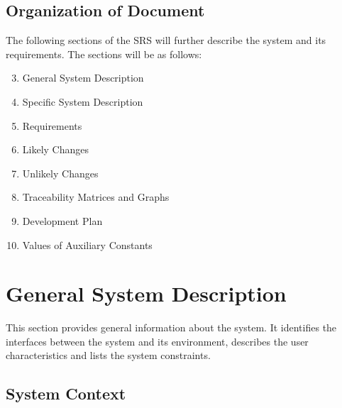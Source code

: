\documentclass[12pt]{article}
\begin{document}
\subsection{Organization of Document}

The following sections of the SRS will further describe the system and its requirements. The sections will be as follows:

\begin{enumerate}
	\setcounter{enumi}{2}
	\item General System Description
	\item Specific System Description
	\item Requirements
	\item Likely Changes
	\item Unlikely Changes
	\item Traceability Matrices and Graphs
	\item Development Plan
	\item Values of Auxiliary Constants
\end{enumerate}

\newpage

\section{General System Description}

This section provides general information about the system.  It identifies the
interfaces between the system and its environment, describes the user
characteristics and lists the system constraints.  


\subsection{System Context}
\end{document}
